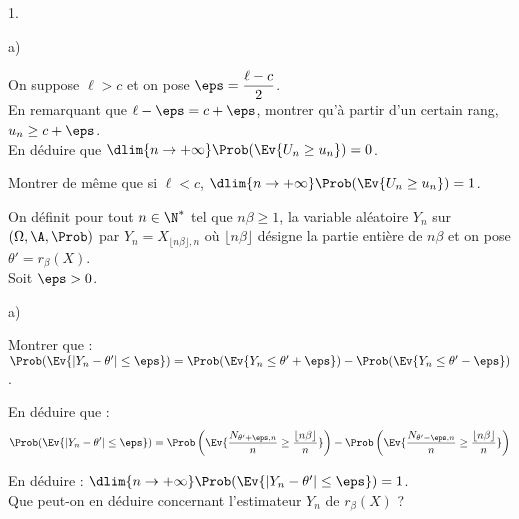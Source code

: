 \begin{noliste}{1.}
\begin{noliste}{a)}
    

    
    \item On suppose $\ell >c$ et on pose $\eps = 
    \dfrac{\ell-c}{2}$.\\
    En remarquant que $\ell-\eps=c+\eps$, montrer qu'à 
    partir d'un certain rang, $u_n \geq c+\eps$.\\
    En déduire que $\dlim{n \to +\infty}\Prob(\Ev{U_n \geq 
    u_n})=0$. 
    
    
    
    

    
    \item Montrer de même que si $\ell <c$, $\dlim{n 
    \to +\infty} \Prob(\Ev{U_n \geq u_n})=1$. 
    
    
  \end{noliste}
  
  
  \newpage
  

  \item On définit pour tout $n \in \N^*$ tel que $n \beta \geq 1$, 
  la variable aléatoire $Y_n$ sur $(\Omega,\A,\Prob)$ par 
  $Y_n=X_{\lfloor n\beta \rfloor, n}$ où $\lfloor n\beta \rfloor$ 
  désigne la partie entière de $n\beta$ et on pose 
  $\theta'=r_{\beta}(X)$.\\
  Soit $\eps >0$.
  \begin{noliste}{a)}
    \setlength{\itemsep}{2mm}
    \item Montrer que : $\Prob(\Ev{|Y_n-\theta'| \leq
    \eps})=\Prob(\Ev{Y_n \leq \theta'+\eps}) - \Prob(\Ev{Y_n \leq
    \theta'-\eps})$. 
    
    
    
    
    

    
    \item En déduire que :
    \[
     \Prob( \Ev{ |Y_n- \theta' | \leq\eps} )=\Prob\left( \Ev{ 
     \dfrac{N_{\theta'+\eps,n}}{n} \geq \dfrac{\lfloor n\beta 
     \rfloor}{n}} \right)-\Prob\left( \Ev{ 
     \dfrac{N_{\theta'-\eps,n}}{n} \geq \dfrac{\lfloor n\beta 
     \rfloor}{n}} \right)
    \]
    
    
    
    \item En déduire : $\dlim{n \to +\infty} 
    \Prob(\Ev{|Y_n - \theta'| \leq \eps})=1$.\\
    Que peut-on en déduire concernant l'estimateur $Y_n$ de 
    $r_\beta(X)$ ?
    
    
  \end{noliste}
  

\end{noliste}
